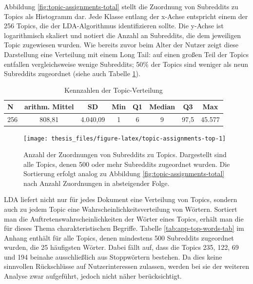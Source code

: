 \documentclass[11pt,a4paper,twoside]{article}
\begin{document}
Abbildung \ref{fig:topic-assignments-total} stellt die Zuordnung von
Subreddits zu Topics als Histogramm dar. Jede Klasse entlang der x-Achse
entspricht einem der 256 Topics, die der LDA-Algorithmus identifizieren
sollte. Die y-Achse ist logarithmisch skaliert und notiert die Anzahl an
Subreddits, die dem jeweiligen Topic zugewiesen wurden. Wie bereits
zuvor beim Alter der Nutzer zeigt diese Darstellung eine Verteilung mit
einem Long Tail: auf einen großen Teil der Topics entfallen
vergleichsweise wenige Subreddits; 50\% der Topics sind weniger als neun
Subreddits zugeordnet (siehe auch Tabelle
\ref{tab:topic-assignments-summary}).



\begin{table}

\caption{\label{tab:topic-assignments-summary}Kennzahlen der Topic-Verteilung}
\centering
\begin{tabular}[t]{lccccccc}
\toprule
N & arithm. Mittel & SD & Min & Q1 & Median & Q3 & Max\\
\midrule
256 & 808,81 & 4.040,09 & 1 & 6 & 9 & 97,5 & 45.577\\
\bottomrule
\end{tabular}
\end{table}







\begin{figure}

{\centering \texttt{[image: thesis\_files/figure-latex/topic-assignments-top-1]} 

}

\caption{Anzahl der Zuordnungen von Subreddits zu
Topics. Dargestellt sind alle Topics, denen 500 oder mehr Subreddits
zugeordnet wurden. Die Sortierung erfolgt analog zu Abbildung
\ref{fig:topic-assignments-total} nach Anzahl Zuordnungen in
absteigender Folge.}\label{fig:topic-assignments-top}
\end{figure}

LDA liefert nicht nur für jedes Dokument eine Verteilung von Topics,
sondern auch zu jedem Topic eine Wahrscheinlichkeitsverteilung von
Wörtern. Sortiert man die Auftretenswahrscheinlichkeiten der Wörter
eines Topics, erhält man die für dieses Thema charakteristischen
Begriffe. Tabelle \ref{tab:app-top-words-tab} im Anhang enthält für alle
Topics, denen mindestens 500 Subreddits zugeordnet wurden, die 25
häufigsten Wörter. Dabei fällt auf, dass die Topics 235, 122, 69 und 194
beinahe ausschließlich aus Stoppwörtern bestehen. Da dies keine
sinnvollen Rückschlüsse auf Nutzerinteressen zulassen, werden bei sie
der weiteren Analyse zwar aufgeführt, jedoch nicht näher berücksichtigt.
\end{document}

